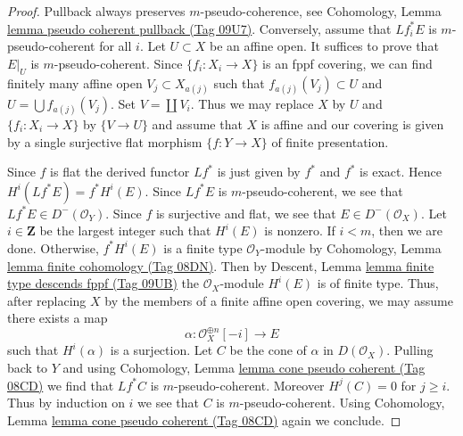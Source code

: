 \documentclass{amsart}
\theoremstyle{plain}
\theoremstyle{definition}
\theoremstyle{remark}
\numberwithin{equation}{subsection}
\begin{document}
\begin{proof}
Pullback always preserves $m$-pseudo-coherence, see
Cohomology, Lemma \href{https://stacks.math.columbia.edu/tag/09U7}{lemma pseudo coherent pullback (Tag 09U7)}.
Conversely, assume that $Lf_i^*E$ is $m$-pseudo-coherent for all $i$.
Let $U \subset X$ be an affine open. It suffices to prove that
$E|_U$ is $m$-pseudo-coherent. Since $\{f_i : X_i \to X\}$ is an
fppf covering, we can find finitely many affine open $V_j \subset X_{a(j)}$
such that $f_{a(j)}(V_j) \subset U$ and $U = \bigcup f_{a(j)}(V_j)$.
Set $V = \coprod V_i$.
Thus we may replace $X$ by $U$ and $\{f_i : X_i \to X\}$ by
$\{V \to U\}$ and assume that $X$ is affine and our covering
is given by a single surjective flat morphism $\{f : Y \to X\}$
of finite presentation.

\medskip\noindent
Since $f$ is flat the derived functor $Lf^*$ is just given by $f^*$ and $f^*$
is exact. Hence $H^i(Lf^*E) = f^*H^i(E)$. Since $Lf^*E$ is $m$-pseudo-coherent,
we see that $Lf^*E \in D^-(\mathcal{O}_Y)$. Since $f$ is surjective and flat,
we see that $E \in D^-(\mathcal{O}_X)$. Let $i \in \mathbf{Z}$ be the largest
integer such that $H^i(E)$ is nonzero. If $i < m$, then we are done. Otherwise,
$f^*H^i(E)$ is a finite type $\mathcal{O}_Y$-module by
Cohomology, Lemma \href{https://stacks.math.columbia.edu/tag/08DN}{lemma finite cohomology (Tag 08DN)}.
Then by Descent, Lemma \href{https://stacks.math.columbia.edu/tag/09UB}{lemma finite type descends fppf (Tag 09UB)}
the $\mathcal{O}_X$-module $H^i(E)$ is of finite type.
Thus, after replacing $X$ by the members of a finite affine open covering,
we may assume there exists a map
$$
\alpha : \mathcal{O}_X^{\oplus n}[-i] \longrightarrow E
$$
such that $H^i(\alpha)$ is a surjection. Let $C$ be the cone of $\alpha$
in $D(\mathcal{O}_X)$. Pulling back to $Y$ and using
Cohomology, Lemma \href{https://stacks.math.columbia.edu/tag/08CD}{lemma cone pseudo coherent (Tag 08CD)}
we find that $Lf^*C$ is $m$-pseudo-coherent. Moreover $H^j(C) = 0$
for $j \geq i$. Thus by induction on $i$ we see that $C$ is
$m$-pseudo-coherent. Using
Cohomology, Lemma \href{https://stacks.math.columbia.edu/tag/08CD}{lemma cone pseudo coherent (Tag 08CD)}
again we conclude.
\end{proof}
\end{document}
